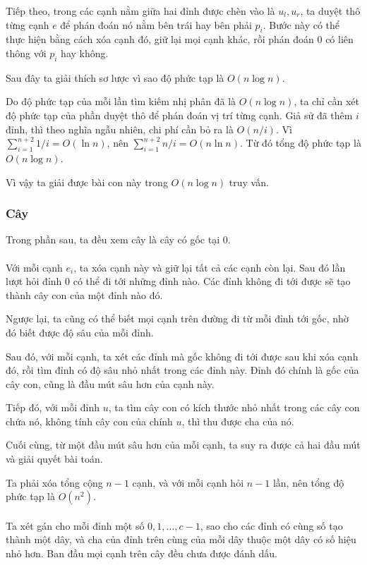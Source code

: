\documentclass[11pt]{article}
\begin{document}
Tiếp theo, trong các cạnh nằm giữa hai đỉnh được chèn vào là \(u_l,u_r\), ta
duyệt thô từng cạnh \(e\) để phán đoán nó nằm bên trái hay bên phải \(p_i\).
Bước này có thể thực hiện bằng cách xóa cạnh đó, giữ lại mọi cạnh khác, rồi
phán đoán \(0\) có liên thông với \(p_i\) hay không.

Sau đây ta giải thích sơ lược vì sao độ phức tạp là \(O(n\log n)\).

Do độ phức tạp của mỗi lần tìm kiếm nhị phân đã là \(O(n\log n)\), ta chỉ cần
xét độ phức tạp của phần duyệt thô để phán đoán vị trí từng cạnh. Giả sử đã
thêm \(i\) đỉnh, thì theo nghĩa ngẫu nhiên, chi phí cần bỏ ra là \(O(n/i)\). Vì
\(\sum_{i=1}^{n+2}1/i=O(\ln n)\), nên
\(\sum_{i=1}^{n+2} n/i=O(n\ln n)\). Từ đó tổng độ phức tạp là
\(O(n\log n)\).

Vì vậy ta giải được bài con này trong \(O(n\log n)\) truy vấn.

\subsubsection{Cây}

Trong phần sau, ta đều xem cây là cây có gốc tại \(0\).

\paragraph{}
Với mỗi cạnh \(e_i\), ta xóa cạnh này và giữ lại tất cả các cạnh còn lại. Sau
đó lần lượt hỏi đỉnh \(0\) có thể đi tới những đỉnh nào. Các đỉnh không đi tới
được sẽ tạo thành cây con của một đỉnh nào đó.

Ngược lại, ta cũng có thể biết mọi cạnh trên đường đi từ mỗi đỉnh tới gốc, nhờ
đó biết được độ sâu của mỗi đỉnh.

Sau đó, với mỗi cạnh, ta xét các đỉnh mà gốc không đi tới được sau khi xóa cạnh
đó, rồi tìm đỉnh có độ sâu nhỏ nhất trong các đỉnh này. Đỉnh đó chính là gốc
của cây con, cũng là đầu mút sâu hơn của cạnh này.

Tiếp đó, với mỗi đỉnh \(u\), ta tìm cây con có kích thước nhỏ nhất trong các
cây con chứa nó, không tính cây con của chính \(u\), thì thu được cha của nó.

Cuối cùng, từ một đầu mút sâu hơn của mỗi cạnh, ta suy ra được cả hai đầu mút
và giải quyết bài toán.

Ta phải xóa tổng cộng \(n-1\) cạnh, và với mỗi cạnh hỏi \(n-1\) lần, nên tổng
độ phức tạp là \(O(n^2)\).

\paragraph{}
Ta xét gán cho mỗi đỉnh một số \(0,1,\ldots,c-1\), sao cho các đỉnh có cùng số
tạo thành một dây, và cha của đỉnh trên cùng của mỗi dây thuộc một dây có số
hiệu nhỏ hơn. Ban đầu mọi cạnh trên cây đều chưa được đánh dấu.
\end{document}
